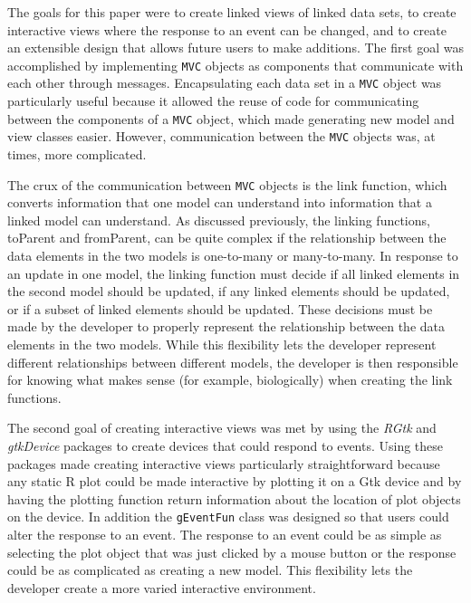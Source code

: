 \documentclass[11pt]{article}
\newcommand{\Rfunction}[1]{{\textsf{#1}}}
\newcommand{\Robject}[1]{{\texttt{#1}}}
\newcommand{\Rpackage}[1]{{\textit{#1}}}
\newcommand{\Rclass}[1]{\texttt{#1}}
\begin{document}
The goals for this paper were to create linked views of linked data sets, to
create interactive views where the response to an event can be changed, and to
create an extensible design that allows future users to make additions.
The first goal was accomplished by implementing \Robject{MVC} objects as
components that communicate with each other through messages.  Encapsulating
each data set in a \Robject{MVC} object was particularly useful because it
allowed the reuse of code for communicating between the components of a
\Robject{MVC} object, which made generating new model and view classes easier.
However, communication between the \Robject{MVC} objects was, at times, more
complicated. 

The crux of the communication between \Robject{MVC} objects is the link
function, which converts information that one model can understand into
information that a linked model can understand.  As discussed previously, the
linking functions, \Rfunction{toParent} and \Rfunction{fromParent}, can be
quite complex if the relationship between the data elements in the two models
is one-to-many or many-to-many.  In response to an update in one model, the
linking function must decide if all linked elements in the second model
should be updated, if any linked elements should be updated, or if a subset of
linked elements should be updated.  These decisions must be made by the
developer to properly represent the relationship between the data elements in
the two models.  While this flexibility lets the developer represent different
relationships between different models, the developer is then responsible for
knowing what makes sense (for example, biologically) when creating the link
functions. 

The second goal of creating interactive views was met by using the
\Rpackage{RGtk} and \Rpackage{gtkDevice} packages to create devices that could
respond to events.  Using these packages made creating interactive views
particularly straightforward because any static R plot could be made
interactive by plotting it on a Gtk device and by having the plotting function
return information about the location of plot objects on the device.  In
addition the \Rclass{gEventFun} class was designed so that users could alter
the response to an event.  The response to an event could be as simple as
selecting the plot object that was just clicked by a mouse button or the
response could be as complicated as creating a new model.  This flexibility
lets the developer create a more varied interactive environment.
\end{document}

